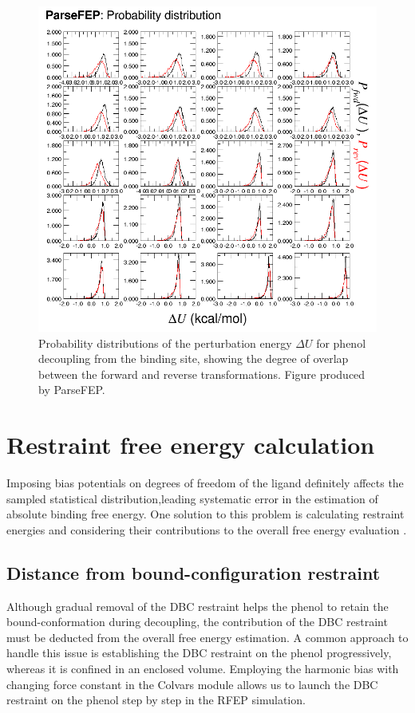 \documentclass[9pt,tutorial]{livecoms}
\begin{document}
\begin{figure}[h!t]
\centering
\includegraphics[width=0.6\linewidth]{probability}
\caption{Probability distributions of the perturbation energy $\Delta U$ for phenol decoupling from the binding site, showing the degree of overlap between the forward and reverse transformations. Figure produced by ParseFEP.}
\label{fig:AFEP-decoupling3}
\end{figure}


\section{Restraint free energy calculation}\label{sec:10}


Imposing bias potentials on degrees of freedom of the ligand definitely affects the sampled statistical distribution,leading systematic error in the estimation of absolute binding free energy. One solution to this problem is calculating restraint energies and considering their contributions to the overall free energy evaluation \cite{Henin2014,Fu2017}.

\subsection{Distance from bound-configuration restraint}
Although gradual removal of the DBC restraint helps the phenol to retain the bound-conformation during decoupling, the contribution of the DBC restraint must be deducted from the overall free energy estimation. A common approach to handle this issue is establishing the DBC restraint on the phenol progressively, whereas it is confined in an enclosed volume. Employing the harmonic bias with changing force constant in the Colvars module allows us to launch the DBC restraint on the phenol step by step in the RFEP simulation.
\end{document}
